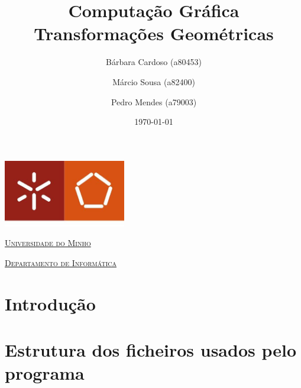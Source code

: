 \documentclass[a4paper]{article}
\begin{document}
\title{Computação Gráfica\\ Transformações Geométricas}
\author{Bárbara Cardoso (a80453) \and Márcio Sousa (a82400) \and Pedro Mendes (a79003)}
\date{\today}

\begin{titlepage}

    \thispagestyle{empty}
    \begin{center}
        \begin{minipage}{0.75\linewidth}
            \centering
            \includegraphics[width=0.4\textwidth]{eng.jpeg}\par\vspace{1cm}
            \vspace{1.5cm}
            \href{https://www.uminho.pt/PT}{\scshape\LARGE Universidade do Minho} \par
            \vspace{1cm}
            \href{https://www.di.uminho.pt/}{\scshape\Large Departamento de Informática} \par
            \vspace{1.5cm}

            \maketitle
        \end{minipage}
    \end{center}

\end{titlepage}

\tableofcontents

\pagebreak

\section{Introdução}

\section{Estrutura dos ficheiros usados pelo programa}
\end{document}
